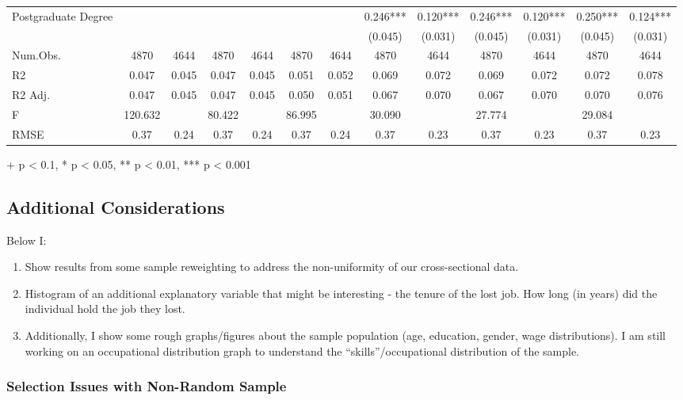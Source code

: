 \documentclass[
]{article}
\providecommand{\tightlist}{%
  \setlength{\itemsep}{0pt}\setlength{\parskip}{0pt}}
\begin{document}
\begin{table}[t]
\begin{tabular*}{\linewidth}{@{\extracolsep{\fill}}lcccccccccccc}
Postgraduate Degree &  &  &  &  &  &  & 0.246*** & 0.120*** & 0.246*** & 0.120*** & 0.250*** & 0.124*** \\ 
{} & {} & {} & {} & {} & {} & {} & {(0.045)} & {(0.031)} & {(0.045)} & {(0.031)} & {(0.045)} & {(0.031)} \\ 
Num.Obs. & 4870 & 4644 & 4870 & 4644 & 4870 & 4644 & 4870 & 4644 & 4870 & 4644 & 4870 & 4644 \\ 
R2 & 0.047 & 0.045 & 0.047 & 0.045 & 0.051 & 0.052 & 0.069 & 0.072 & 0.069 & 0.072 & 0.072 & 0.078 \\ 
R2 Adj. & 0.047 & 0.045 & 0.047 & 0.045 & 0.050 & 0.051 & 0.067 & 0.070 & 0.067 & 0.070 & 0.070 & 0.076 \\ 
F & 120.632 &  & 80.422 &  & 86.995 &  & 30.090 &  & 27.774 &  & 29.084 &  \\ 
RMSE & 0.37 & 0.24 & 0.37 & 0.24 & 0.37 & 0.24 & 0.37 & 0.23 & 0.37 & 0.23 & 0.37 & 0.23 \\ 
\bottomrule
\end{tabular*}
\begin{minipage}{\linewidth}
+ p < 0.1, * p < 0.05, ** p < 0.01, *** p < 0.001\\
\end{minipage}
\end{table}

\subsection{Additional Considerations}\label{additional-considerations}

Below I:

\begin{enumerate}
\def\labelenumi{\arabic{enumi}.}
\tightlist
\item
  Show results from some sample reweighting to address the
  non-uniformity of our cross-sectional data.
\item
  Histogram of an additional explanatory variable that might be
  interesting - the tenure of the lost job. How long (in years) did the
  individual hold the job they lost.
\item
  Additionally, I show some rough graphs/figures about the sample
  population (age, education, gender, wage distributions). I am still
  working on an occupational distribution graph to understand the
  ``skills''/occupational distribution of the sample.
\end{enumerate}

\subsubsection{Selection Issues with Non-Random
Sample}\label{selection-issues-with-non-random-sample}
\end{document}
